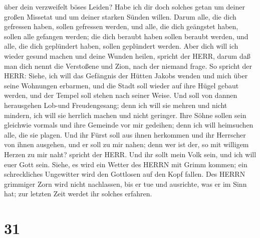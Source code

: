 über dein verzweifelt böses Leiden? Habe ich dir doch solches getan um
deiner großen Missetat und um deiner starken Sünden willen.
 Darum alle, die dich gefressen haben, sollen gefressen
werden, und alle, die dich geängstet haben, sollen alle gefangen werden;
die dich beraubt haben sollen beraubt werden, und alle, die dich
geplündert haben, sollen geplündert werden.  Aber dich will
ich wieder gesund machen und deine Wunden heilen, spricht der HERR,
darum daß man dich nennt die Verstoßene und Zion, nach der niemand
frage.  So spricht der HERR: Siehe, ich will das Gefängnis
der Hütten Jakobs wenden und mich über seine Wohnungen erbarmen, und die
Stadt soll wieder auf ihre Hügel gebaut werden, und der Tempel soll
stehen nach seiner Weise.  Und soll von dannen herausgehen
Lob-und Freudengesang; denn ich will sie mehren und nicht mindern, ich
will sie herrlich machen und nicht geringer.  Ihre Söhne
sollen sein gleichwie vormals und ihre Gemeinde vor mir gedeihen; denn
ich will heimsuchen alle, die sie plagen.  Und ihr Fürst
soll aus ihnen herkommen und ihr Herrscher von ihnen ausgehen, und er
soll zu mir nahen; denn wer ist der, so mit willigem Herzen zu mir naht?
spricht der HERR.  Und ihr sollt mein Volk sein, und ich
will euer Gott sein.  Siehe, es wird ein Wetter des HERRN
mit Grimm kommen; ein schreckliches Ungewitter wird den Gottlosen auf
den Kopf fallen.  Des HERRN grimmiger Zorn wird nicht
nachlassen, bis er tue und ausrichte, was er im Sinn hat; zur letzten
Zeit werdet ihr solches erfahren.

\hypertarget{section-30}{%
\section{31}\label{section-30}}

